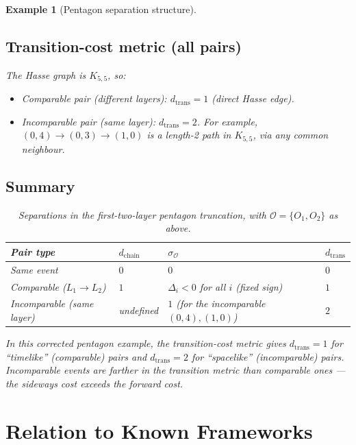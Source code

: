 \documentclass[12pt]{article}
\newtheorem{example}[theorem]{Example}
\newcommand{\Ocal}{\mathcal{O}}
\begin{document}
\begin{example}[Pentagon separation structure]
\subsection*{Transition-cost metric (all pairs)}

The Hasse graph is $K_{5,5}$, so:
\begin{itemize}
    \item Comparable pair (different layers): $d_{\mathrm{trans}} = 1$ (direct Hasse edge).
    \item Incomparable pair (same layer): $d_{\mathrm{trans}} = 2$. For example, $(0,4) \to (0,3) \to (1,0)$ is a length-2 path in $K_{5,5}$, via any common neighbour.
\end{itemize}

\subsection*{Summary}

\begin{table}[ht]
\centering
\caption{Separations in the first-two-layer pentagon truncation, with $\Ocal = \{O_1, O_2\}$ as above.}
\label{tab:pentagon}
\begin{tabular}{@{}llll@{}}
\toprule
Pair type & $d_{\mathrm{chain}}$ & $\sigma_{\Ocal}$ & $d_{\mathrm{trans}}$ \\
\midrule
Same event & $0$ & $0$ & $0$ \\
Comparable ($L_1 \to L_2$) & $1$ & $\Delta_i < 0$ for all $i$ (fixed sign) & $1$ \\
Incomparable (same layer) & undefined & $1$ (for the incomparable $(0,4),(1,0)$) & $2$ \\
\bottomrule
\end{tabular}
\end{table}

In this corrected pentagon example, the transition-cost metric gives $d_{\mathrm{trans}} = 1$ for ``timelike'' (comparable) pairs and $d_{\mathrm{trans}} = 2$ for ``spacelike'' (incomparable) pairs. Incomparable events are \textit{farther} in the transition metric than comparable ones --- the sideways cost exceeds the forward cost.
\end{example}

\section{Relation to Known Frameworks}\label{sec:comparison_lit}
\end{document}
